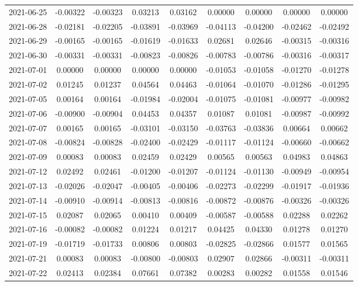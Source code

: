 \begin{footnotesize}
\begin{longtable}{lcccccccc}
2021-06-25 & -0.00322 & -0.00323 & 0.03213 & 0.03162 & 0.00000 & 0.00000 & 0.00000 & 0.00000 \\
2021-06-28 & -0.02181 & -0.02205 & -0.03891 & -0.03969 & -0.04113 & -0.04200 & -0.02462 & -0.02492 \\
2021-06-29 & -0.00165 & -0.00165 & -0.01619 & -0.01633 & 0.02681 & 0.02646 & -0.00315 & -0.00316 \\
2021-06-30 & -0.00331 & -0.00331 & -0.00823 & -0.00826 & -0.00783 & -0.00786 & -0.00316 & -0.00317 \\
2021-07-01 & 0.00000 & 0.00000 & 0.00000 & 0.00000 & -0.01053 & -0.01058 & -0.01270 & -0.01278 \\
2021-07-02 & 0.01245 & 0.01237 & 0.04564 & 0.04463 & -0.01064 & -0.01070 & -0.01286 & -0.01295 \\
2021-07-05 & 0.00164 & 0.00164 & -0.01984 & -0.02004 & -0.01075 & -0.01081 & -0.00977 & -0.00982 \\
2021-07-06 & -0.00900 & -0.00904 & 0.04453 & 0.04357 & 0.01087 & 0.01081 & -0.00987 & -0.00992 \\
2021-07-07 & 0.00165 & 0.00165 & -0.03101 & -0.03150 & -0.03763 & -0.03836 & 0.00664 & 0.00662 \\
2021-07-08 & -0.00824 & -0.00828 & -0.02400 & -0.02429 & -0.01117 & -0.01124 & -0.00660 & -0.00662 \\
2021-07-09 & 0.00083 & 0.00083 & 0.02459 & 0.02429 & 0.00565 & 0.00563 & 0.04983 & 0.04863 \\
2021-07-12 & 0.02492 & 0.02461 & -0.01200 & -0.01207 & -0.01124 & -0.01130 & -0.00949 & -0.00954 \\
2021-07-13 & -0.02026 & -0.02047 & -0.00405 & -0.00406 & -0.02273 & -0.02299 & -0.01917 & -0.01936 \\
2021-07-14 & -0.00910 & -0.00914 & -0.00813 & -0.00816 & -0.00872 & -0.00876 & -0.00326 & -0.00326 \\
2021-07-15 & 0.02087 & 0.02065 & 0.00410 & 0.00409 & -0.00587 & -0.00588 & 0.02288 & 0.02262 \\
2021-07-16 & -0.00082 & -0.00082 & 0.01224 & 0.01217 & 0.04425 & 0.04330 & 0.01278 & 0.01270 \\
2021-07-19 & -0.01719 & -0.01733 & 0.00806 & 0.00803 & -0.02825 & -0.02866 & 0.01577 & 0.01565 \\
2021-07-21 & 0.00083 & 0.00083 & -0.00800 & -0.00803 & 0.02907 & 0.02866 & -0.00311 & -0.00311 \\
2021-07-22 & 0.02413 & 0.02384 & 0.07661 & 0.07382 & 0.00283 & 0.00282 & 0.01558 & 0.01546 \\

\end{longtable}
\end{footnotesize}
